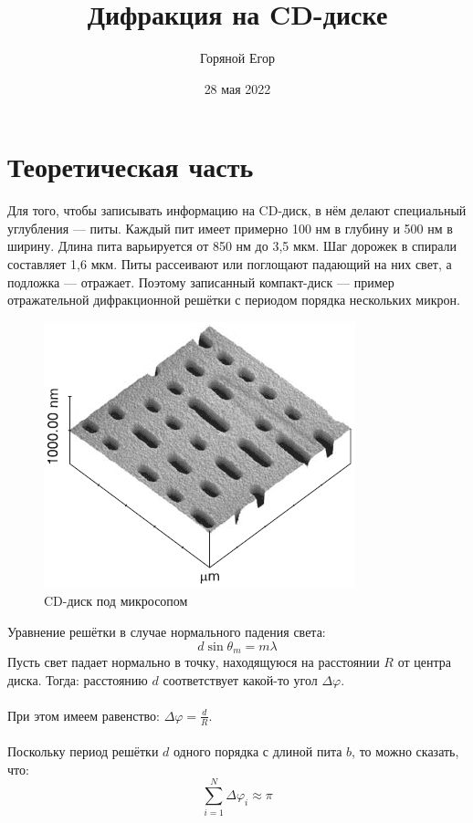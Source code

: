 \documentclass[a4paper]{article}
\begin{document}
\author{Горяной Егор}
\date{28 мая 2022}
\title{Дифракция на CD-диске}
\maketitle


\section{Теоретическая часть}
{Для того, чтобы записывать информацию на CD-диск, в нём делают специальный углубления --- питы. Каждый пит имеет примерно 100 нм в глубину и 500 нм в ширину. Длина пита варьируется от 850 нм до 3,5 мкм. Шаг дорожек в спирали составляет 1,6 мкм. Питы рассеивают или поглощают падающий на них свет, а подложка — отражает. Поэтому записанный компакт-диск — пример отражательной дифракционной решётки с периодом порядка нескольких микрон.}
\begin{figure}[H]
    \centering
    \includegraphics[scale=1]{cd_disk.png}
    \caption{CD-диск под микросопом}
\end{figure}
Уравнение решётки в случае нормального падения света:
\begin{equation}\label{eq1}
d\sin\theta_m=m\lambda
\end{equation}
Пусть свет падает нормально в точку, находящуюся на расстоянии $R$ от центра диска. Тогда: расстоянию $d$ соответствует какой-то угол $\Delta\varphi$.\\
\\
При этом имеем равенство: $\Delta\varphi=\displaystyle\frac{d}{R}$.\\
\\
Поскольку период решётки $d$ одного порядка с длиной пита $b$, то можно сказать, что:
\begin{equation}\label{eq2}
\displaystyle\sum\limits_{i=1}^{N}\Delta\varphi_i\approx\pi
\end{equation}
\end{document}
